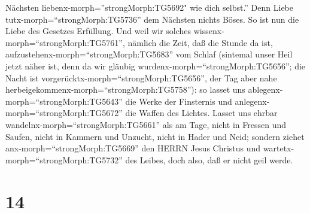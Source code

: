 Nächsten liebenx-morph=''strongMorph:TG5692" wie dich selbst.''
 Denn Liebe tutx-morph=``strongMorph:TG5736'' dem Nächsten
nichts Böses. So ist nun die Liebe des Gesetzes Erfüllung. 
Und weil wir solches wissenx-morph=``strongMorph:TG5761'', nämlich die
Zeit, daß die Stunde da ist, aufzustehenx-morph=``strongMorph:TG5683''
vom Schlaf (sintemal unser Heil jetzt näher ist, denn da wir gläubig
wurdenx-morph=``strongMorph:TG5656'';  die Nacht ist
vorgerücktx-morph=``strongMorph:TG5656'', der Tag aber nahe
herbeigekommenx-morph=``strongMorph:TG5758''): so lasset uns
ablegenx-morph=``strongMorph:TG5643'' die Werke der Finsternis und
anlegenx-morph=``strongMorph:TG5672'' die Waffen des Lichtes.
 Lasset uns ehrbar wandelnx-morph=``strongMorph:TG5661''
als am Tage, nicht in Fressen und Saufen, nicht in Kammern und Unzucht,
nicht in Hader und Neid;  sondern ziehet
anx-morph=``strongMorph:TG5669'' den HERRN Jesus Christus und
wartetx-morph=``strongMorph:TG5732'' des Leibes, doch also, daß er nicht
geil werde.

\hypertarget{section-13}{%
\section{14}\label{section-13}}

